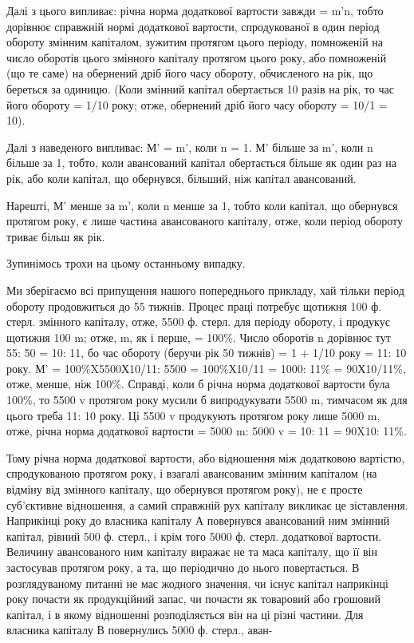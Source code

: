 Далі з цього випливає: річна норма додаткової вартости завжди =
m'n, тобто дорівнює справжній нормі додаткової вартости, спродукованої
в один період обороту змінним капіталом, зужитим протягом цього
періоду, помноженій на число оборотів цього змінного капіталу протягом
цього року, або помноженій (що те саме) на обернений дріб його часу
обороту, обчисленого на рік, що береться за одиницю. (Коли
змінний капітал обертається 10 разів на рік, то час його обороту = 1/10 року;
отже, обернений дріб його часу обороту = 10/1 = 10).

Далі з наведеного випливає: М' = m', коли n = 1. М' більше за m',
коли n більше за 1, тобто, коли авансований капітал обертається більше
як один раз на рік, або коли капітал, що обернувся, більший, ніж капітал
авансований.

Нарешті, М' менше за m', коли n менше за 1, тобто коли капітал,
що обернувся протягом року, є лише частина авансованого капіталу, отже,
коли період обороту триває більш як рік.

Зупинімось трохи на цьому останньому випадку.

Ми зберігаємо всі припущення нашого попереднього прикладу, хай
тільки період обороту продовжиться до 55 тижнів. Процес праці потребує
щотижня 100 ф. стерл. змінного капіталу, отже, 5500 ф. стерл. для періоду
обороту, і продукує щотижня 100 m; отже, m, як і перше, = 100\%.
Число оборотів n дорівнює тут 55: 50 = 10: 11, бо час обороту (беручи рік
50 тижнів) = 1 + 1/10 року = 11: 10 року. М' = 100\%X5500Х10/11: 5500 =
100\%Х10/11 = 1000: 11\% = 90Х10/11\%, отже, менше, ніж 100\%. Справді,
коли б річна норма додаткової вартости була 100\%, то 5500 v протягом
року мусили б випродукувати 5500 m, тимчасом як для цього треба 11: 10
року. Ці 5500 v продукують протягом року лише 5000 m, отже, річна
норма додаткової вартости = 5000 m: 5000 v = 10: 11 = 90X10: 11\%.

Тому річна норма додаткової вартости, або відношення між додатковою
вартістю, спродукованою протягом року, і взагалі авансованим
змінним капіталом (на відміну від змінного капіталу, що обернувся
протягом року), не є просте суб’єктивне відношення, а самий
справжній рух капіталу викликає це зіставлення. Наприкінці року до
власника капіталу А повернувся авансований ним змінний капітал, рівний
500 ф. стерл., і крім того 5000 ф. стерл. додаткової вартости. Величину
авансованого ним капіталу виражає не та маса капіталу, що її він застосував
протягом року, а та, що періодично до нього повертається. В
розглядуваному питанні не має жодного значення, чи існує капітал наприкінці
року почасти як продукційний запас, чи почасти як товаровий
або грошовий капітал, і в якому відношенні розподіляється він на ці
різні частини. Для власника капіталу В повернулись 5000 ф. стерл., аван-
